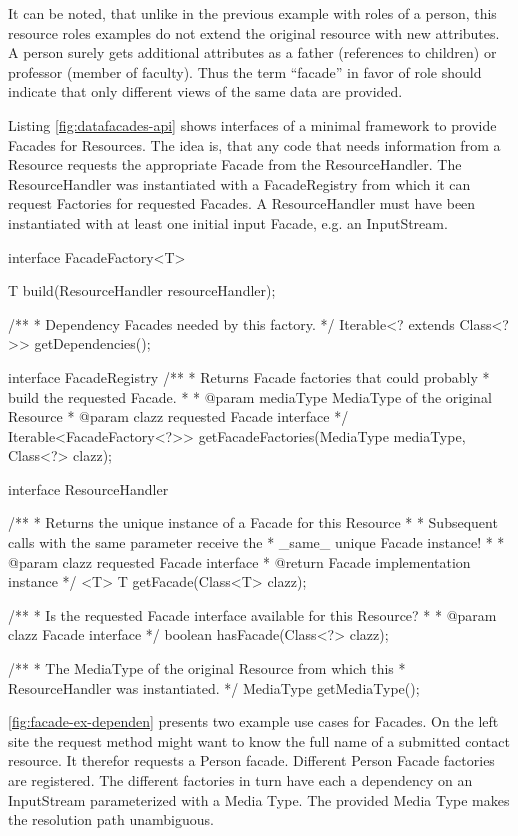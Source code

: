 \documentclass[12pt,a4paper,twoside]{scrartcl}		%
\begin{document}
It can be noted, that unlike in the previous example with roles of a person,
this resource roles examples do not extend the original resource with new
attributes. A person surely gets additional attributes as a father (references
to children) or professor (member of faculty). Thus the term ``facade'' in favor
of role should indicate that only different views of the same data are provided.

Listing \ref{fig:datafacades-api} shows interfaces of a minimal framework to
provide Facades for Resources. The idea is, that any code that needs information
from a Resource requests the appropriate Facade from the ResourceHandler. The
ResourceHandler was instantiated with a FacadeRegistry from which it can request
Factories for requested Facades. A ResourceHandler must have been instantiated
with at least one initial input Facade, e.g. an InputStream.

\begin{javalisting}[label=fig:datafacades-api,
                    float=p,
                   caption={API of the ResourceFacades component}]
interface FacadeFactory<T> {
 T build(ResourceHandler resourceHandler);

 /**
  * Dependency Facades needed by this factory.
  */
 Iterable<? extends Class<?>> getDependencies();
}

interface FacadeRegistry {
 /**
  * Returns Facade factories that could probably
  * build the requested Facade.
  *
  * @param mediaType MediaType of the original Resource
  * @param clazz requested Facade interface
  */
 Iterable<FacadeFactory<?>> getFacadeFactories(MediaType mediaType,
                                               Class<?> clazz);
}

interface ResourceHandler {
 /**
  * Returns the unique instance of a Facade for this Resource
  *
  * Subsequent calls with the same parameter receive the
  * _same_ unique Facade instance!
  *
  * @param clazz requested Facade interface
  * @return Facade implementation instance
  */
 <T> T getFacade(Class<T> clazz);

 /**
  * Is the requested Facade interface available for this Resource?
  *
  * @param clazz Facade interface
  */
 boolean hasFacade(Class<?> clazz);

 /**
  * The MediaType of the original Resource from which this 
  * ResourceHandler was instantiated.
  */
 MediaType getMediaType();
}
\end{javalisting}

\autoref{fig:facade-ex-dependen} presents two example use cases for Facades. On
the left site the request method might want to know the full name of a submitted
contact resource. It therefor requests a Person facade. Different Person Facade
factories are registered. The different factories in turn have each a dependency
on an InputStream parameterized with a Media Type. The provided Media Type makes
the resolution path unambiguous.
\end{document}
